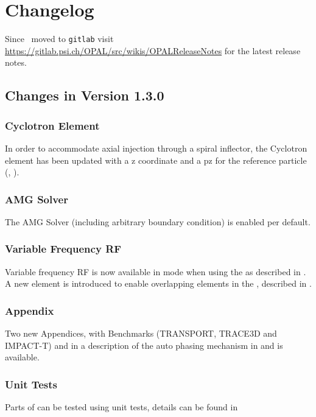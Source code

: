 

\chapter{Changelog}
\label{chp:changelog}

Since \opal\ moved to {\tt gitlab} visit \url{https://gitlab.psi.ch/OPAL/src/wikis/OPALReleaseNotes} for the latest release notes.


\section{Changes in \opal Version 1.3.0}
\subsection{Cyclotron Element}
In order to accommodate axial injection through a spiral inflector, the Cyclotron element has been updated with
a z coordinate and a pz for the reference particle (, ).

\subsection{AMG Solver}
The AMG Solver (including arbitrary boundary condition) is enabled per default.

\subsection{Variable Frequency RF}
Variable frequency RF is now available in \opalcycl mode when using the
 as described in
. A new 
element is introduced to enable overlapping elements in the
, described in .

\subsection{Appendix}
Two new Appendices,   with Benchmarks (TRANSPORT, TRACE3D and IMPACT-T) and in  a description of the auto phasing mechanism in \opalt and \opalenv is available.

\subsection{Unit Tests}
Parts of \opal can be tested using unit tests, details can be found in 

